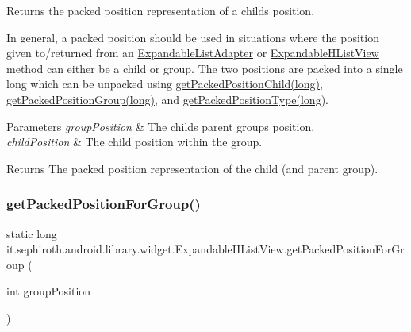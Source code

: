 Returns the packed position representation of a child\textquotesingle{}s position. 

In general, a packed position should be used in situations where the position given to/returned from an \hyperlink{}{Expandable\+List\+Adapter} or \hyperlink{classit_1_1sephiroth_1_1android_1_1library_1_1widget_1_1_expandable_h_list_view}{Expandable\+H\+List\+View} method can either be a child or group. The two positions are packed into a single long which can be unpacked using \hyperlink{classit_1_1sephiroth_1_1android_1_1library_1_1widget_1_1_expandable_h_list_view_a9325b28ae11af4325839c0a15e640152}{get\+Packed\+Position\+Child(long)}, \hyperlink{classit_1_1sephiroth_1_1android_1_1library_1_1widget_1_1_expandable_h_list_view_ada2257e0f53c0c4dfe19c7e0fa155aad}{get\+Packed\+Position\+Group(long)}, and \hyperlink{classit_1_1sephiroth_1_1android_1_1library_1_1widget_1_1_expandable_h_list_view_ae574c6efbf83f1bb3d588c13a7bd0ef1}{get\+Packed\+Position\+Type(long)}.


\begin{DoxyParams}{Parameters}
{\em group\+Position} & The child\textquotesingle{}s parent group\textquotesingle{}s position. \\
\hline
{\em child\+Position} & The child position within the group. \\
\hline
\end{DoxyParams}
\begin{DoxyReturn}{Returns}
The packed position representation of the child (and parent group). 
\end{DoxyReturn}
\mbox{\label{classit_1_1sephiroth_1_1android_1_1library_1_1widget_1_1_expandable_h_list_view_a4a66c5a45d940fb451591d3930f4fbab}} 
\subsubsection{\texorpdfstring{get\+Packed\+Position\+For\+Group()}{getPackedPositionForGroup()}}
{\footnotesize\ttfamily static long it.\+sephiroth.\+android.\+library.\+widget.\+Expandable\+H\+List\+View.\+get\+Packed\+Position\+For\+Group (\begin{DoxyParamCaption}\item[{int}]{group\+Position }\end{DoxyParamCaption})\hspace{0.3cm}{\ttfamily [static]}}

